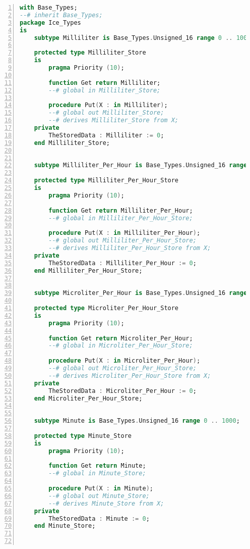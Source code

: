 \singlespacing
\begin{lstlisting}[language=ada, gobble=0, numbers=left, caption={\lstinline{Ice_Types} package}]
with Base_Types;
--# inherit Base_Types;
package Ice_Types
is
    subtype Milliliter is Base_Types.Unsigned_16 range 0 .. 1000;

    protected type Milliliter_Store
    is
        pragma Priority (10);

        function Get return Milliliter;
        --# global in Milliliter_Store;

        procedure Put(X : in Milliliter);
        --# global out Milliliter_Store;
        --# derives Milliliter_Store from X;
    private
        TheStoredData : Milliliter := 0;
    end Milliliter_Store;


    subtype Milliliter_Per_Hour is Base_Types.Unsigned_16 range 0 .. 1000;

    protected type Milliliter_Per_Hour_Store
    is
        pragma Priority (10);

        function Get return Milliliter_Per_Hour;
        --# global in Milliliter_Per_Hour_Store;

        procedure Put(X : in Milliliter_Per_Hour);
        --# global out Milliliter_Per_Hour_Store;
        --# derives Milliliter_Per_Hour_Store from X;
    private
        TheStoredData : Milliliter_Per_Hour := 0;
    end Milliliter_Per_Hour_Store;


    subtype Microliter_Per_Hour is Base_Types.Unsigned_16 range 0 .. 1000;

    protected type Microliter_Per_Hour_Store
    is
        pragma Priority (10);

        function Get return Microliter_Per_Hour;
        --# global in Microliter_Per_Hour_Store;

        procedure Put(X : in Microliter_Per_Hour);
        --# global out Microliter_Per_Hour_Store;
        --# derives Microliter_Per_Hour_Store from X;
    private
        TheStoredData : Microliter_Per_Hour := 0;
    end Microliter_Per_Hour_Store;


    subtype Minute is Base_Types.Unsigned_16 range 0 .. 1000;

    protected type Minute_Store
    is
        pragma Priority (10);

        function Get return Minute;
        --# global in Minute_Store;

        procedure Put(X : in Minute);
        --# global out Minute_Store;
        --# derives Minute_Store from X;
    private
        TheStoredData : Minute := 0;
    end Minute_Store;



\end{lstlisting}
